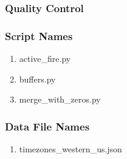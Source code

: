 \subsubsection*{Quality Control}
\subsubsection*{Script Names}
\begin{enumerate}
\item active\_fire.py
\item buffers.py
\item merge\_with\_zeros.py
\end{enumerate}
\subsubsection*{Data File Names}
\begin{enumerate}
\item timezones\_western\_us.json
\end{enumerate}